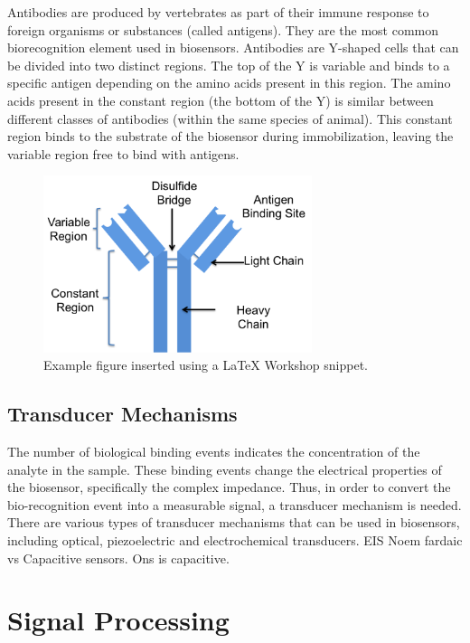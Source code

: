 Antibodies are produced by vertebrates as part of their immune response to foreign organisms or substances (called antigens). They are the most common biorecognition element used in biosensors.\cite{zengRecombinantAntibodiesTheir2012} Antibodies are Y-shaped cells that can be divided into two distinct regions. The top of the Y is variable and binds to a specific antigen depending on the amino acids present in this region. The amino acids present in the constant region (the bottom of the Y) is similar between different classes of antibodies (within the same species of animal).\cite{zengRecombinantAntibodiesTheir2012} This constant region binds to the substrate of the biosensor during immobilization, leaving the variable region free to bind with antigens.\cite{suedaAntibodyImmobilizationImmunosensing2022a}
\begin{figure}[ht]
    \centering
    \includegraphics[width=0.7\textwidth]{antibody.png}
    \caption{Example figure inserted using a LaTeX Workshop snippet.}
    \label{fig:antibody}
\end{figure}

\subsection{Transducer Mechanisms}
The number of biological binding events indicates the concentration of the analyte in the sample. These binding events change the electrical properties of the biosensor, specifically the complex impedance. Thus, in order to convert the bio-recognition event into a measurable signal, a transducer mechanism is needed\cite{bhallaIntroductionBiosensors2016}. There are various types of transducer mechanisms that can be used in biosensors, including optical, piezoelectric and electrochemical transducers. 
EIS
Noem fardaic vs Capacitive sensors. Ons is capacitive.

\section{Signal Processing}

